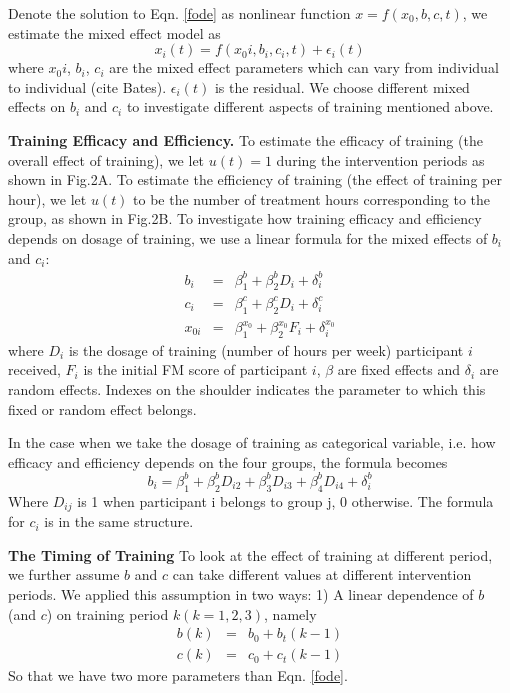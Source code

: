 {Denote the solution to Eqn. \ref{fode} as nonlinear function $ x=f(x_0,b,c,t) $, we estimate the mixed effect model as
\begin{equation}\label{eqn:mixedeffect}
	x_i (t)=f(x_0i,b_i,c_i,t) + \epsilon_i (t)
\end{equation}
where $ x_0i $, $ b_i $, $ c_i $ are the mixed effect parameters which can vary from individual to individual (cite Bates).
$ \epsilon_i (t) $ is the residual. 
We choose different mixed effects on $ b_i $ and $ c_i $ to investigate different aspects of training mentioned above.

\textbf{Training Efficacy and Efficiency.}
To estimate the efficacy of training (the overall effect of training), we let $ u(t)=1 $ during the intervention periods as shown in Fig.2A. 
To estimate the efficiency of training (the effect of training per hour), we let $ u(t) $ to be the number of treatment hours corresponding to the group, as shown in Fig.2B. 
To investigate how training efficacy and efficiency depends on dosage of training, we use a linear formula for the mixed effects of $ b_i $ and $ c_i $:
\begin{eqnarray}
	b_i &=& \beta_1^b + \beta_2^b D_i + \delta_i^b   \\
	c_i &=& \beta_1^c + \beta_2^c D_i + \delta_i^c   \\
	x_{0i} &=& \beta_1^{x_0} + \beta_2^{x_0} F_i + \delta_i^{x_0}
\end{eqnarray}
where $ D_i $ is the dosage of training (number of hours per week) participant $ i $ received, 
$ F_i $ is the initial FM score of participant $ i $, 
$ \beta $ are fixed effects and $ \delta_i $ are random effects. 
Indexes on the shoulder indicates the parameter to which this fixed or random effect belongs.

In the case when we take the dosage of training as categorical variable, i.e. how efficacy and efficiency depends on the four groups, the formula becomes
\begin{equation}
	b_i = \beta_1^b + \beta_2^b D_{i2} + \beta_3^b D_{i3} + \beta_4^b D_{i4} + \delta_i^b
\end{equation}
Where $ D_{ij} $ is 1 when participant i belongs to group j, 0 otherwise. The formula for $ c_i $ is in the same structure.

\textbf{The Timing of Training}
To look at the effect of training at different period, we further assume $ b $ and $ c $ can take different values at different intervention periods. 
We applied this assumption in two ways: 1) A linear dependence of $ b $ (and $ c $) on training period $ k (k=1,2,3) $, namely
\begin{eqnarray}
	b(k) &=& b_0 + b_t (k-1) \\
	c(k) &=& c_0 + c_t (k-1)
\end{eqnarray}
So that we have two more parameters than Eqn. \ref{fode}. 

}
